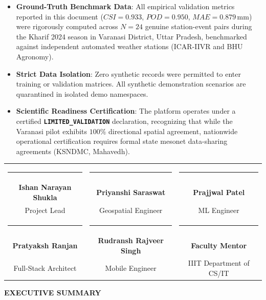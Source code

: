 \documentclass[11pt,a4paper,oneside]{report}
\begin{document}
\vspace{0.4cm}
\begin{innovationbox}
\begin{itemize}[leftmargin=*]
    \item \textbf{Ground-Truth Benchmark Data}: All empirical validation metrics reported in this document ($CSI = 0.933$, $POD = 0.950$, $MAE = 0.879\,\text{mm}$) were rigorously computed across $N=24$ genuine station-event pairs during the Kharif 2024 season in Varanasi District, Uttar Pradesh, benchmarked against independent automated weather stations (ICAR-IIVR and BHU Agronomy).
    \item \textbf{Strict Data Isolation}: Zero synthetic records were permitted to enter training or validation matrices. All synthetic demonstration scenarios are quarantined in isolated demo namespaces.
    \item \textbf{Scientific Readiness Certification}: The platform operates under a certified \textbf{\texttt{LIMITED\_VALIDATION}} declaration, recognizing that while the Varanasi pilot exhibits $100\%$ directional spatial agreement, nationwide operational certification requires formal state mesonet data-sharing agreements (KSNDMC, Mahavedh).
\end{itemize}
\end{innovationbox}

\vspace{1.0cm}
\noindent
\begin{tabular*}{\textwidth}{@{\extracolsep{\fill}}ccc}
\rule{4.5cm}{0.4pt} & \rule{4.5cm}{0.4pt} & \rule{4.5cm}{0.4pt} \\
\textbf{Ishan Narayan Shukla} & \textbf{Priyanshi Saraswat} & \textbf{Prajjwal Patel} \\
Project Lead & Geospatial Engineer & ML Engineer \\[0.8cm]
\rule{4.5cm}{0.4pt} & \rule{4.5cm}{0.4pt} & \rule{4.5cm}{0.4pt} \\
\textbf{Pratyaksh Ranjan} & \textbf{Rudransh Rajveer Singh} & \textbf{Faculty Mentor} \\
Full-Stack Architect & Mobile Engineer & IIIT Department of CS/IT \\
\end{tabular*}

\newpage
\thispagestyle{plain}
\begin{center}
{\Large \textbf{\color{navyblue}EXECUTIVE SUMMARY}}\\[0.4cm]
\end{center}
\end{document}
